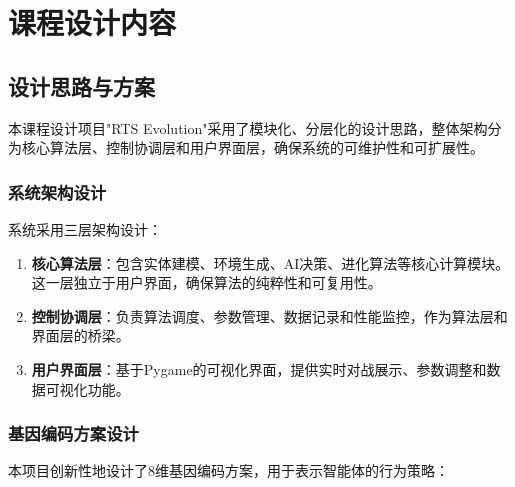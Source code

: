 \documentclass[12pt,a4paper]{article}
\begin{document}
	\newpage
	
	
	
	
	
	
	\section{课程设计内容}
	
	\subsection{设计思路与方案}
	本课程设计项目"RTS Evolution"采用了模块化、分层化的设计思路，整体架构分为核心算法层、控制协调层和用户界面层，确保系统的可维护性和可扩展性。
	
	\subsubsection{系统架构设计}
	系统采用三层架构设计：
	\begin{enumerate}
		\item \textbf{核心算法层}：包含实体建模、环境生成、AI决策、进化算法等核心计算模块。这一层独立于用户界面，确保算法的纯粹性和可复用性。
		
		\item \textbf{控制协调层}：负责算法调度、参数管理、数据记录和性能监控，作为算法层和界面层的桥梁。
		
		\item \textbf{用户界面层}：基于Pygame的可视化界面，提供实时对战展示、参数调整和数据可视化功能。
	\end{enumerate}
	
	\subsubsection{基因编码方案设计}
	本项目创新性地设计了8维基因编码方案，用于表示智能体的行为策略：
	
\end{document}
